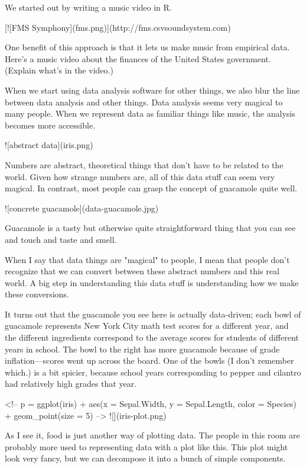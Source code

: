 \documentclass{acm_proc_article-sp}
\begin{document}
We started out by writing a music video in R.

[![FMS Symphony](fms.png)](http://fms.csvsoundsystem.com)

One benefit of this approach is that it lets us make music from empirical data.
Here's a music video about the finances of the United States government.
(Explain what's in the video.)


When we start using data analysis software for other things,
we also blur the line between data analysis and other things.
Data analysis seems very magical to many people. When we represent
data as familiar things like music, the analysis becomes more
accessible.

![abstract data](iris.png)

Numbers are abstract, theoretical things that don't have to be
related to the world. Given how strange numbers are, all of this
data stuff can seem very magical. In contrast, most people can
grasp the concept of guacamole quite well.

![concrete guacamole](data-guacamole.jpg)

Guacamole is a tasty but otherwise quite straightforward thing
that you can see and touch and taste and smell.

When I say that data things are "magical" to people, I mean that
people don't recognize that we can convert between these abstract
numbers and this real world. A big step in understanding this data
stuff is understanding how we make these conversions.

It turns out that the guacamole you see here is actually data-driven;
each bowl of guacamole represents New York City math test scores for
a different year, and the different ingredients correspond to the
average scores for students of different years in school. The bowl
to the right has more guacamole because of grade inflation---scores
went up across the board. One of the bowls (I don't remember which.)
is a bit spicier, because school years corresponding to pepper and
cilantro had relatively high grades that year.

<!--
p = ggplot(iris) + aes(x = Sepal.Width, y = Sepal.Length, color = Species) + geom_point(size = 5)                   
-->
![](iris-plot.png)

As I see it, food is just another way of plotting data. The people
in this room are probably more used to representing data with a plot like this.
This plot
might look very fancy, but we can decompose it into a bunch of simple
components.
\end{document}
